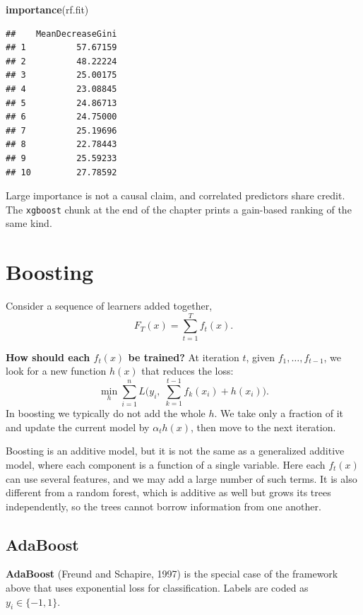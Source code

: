 \documentclass[
]{book}
\newenvironment{Shaded}{\begin{snugshade}}{\end{snugshade}}
\newcommand{\FunctionTok}[1]{\textcolor[rgb]{0.13,0.29,0.53}{\textbf{#1}}}
\newcommand{\NormalTok}[1]{#1}
\begin{document}
\begin{Shaded}
\begin{Highlighting}[]
\FunctionTok{importance}\NormalTok{(rf.fit)}
\end{Highlighting}
\end{Shaded}

\begin{verbatim}
##    MeanDecreaseGini
## 1          57.67159
## 2          48.22224
## 3          25.00175
## 4          23.08845
## 5          24.86713
## 6          24.75000
## 7          25.19696
## 8          22.78443
## 9          25.59233
## 10         27.78592
\end{verbatim}

Large importance is not a causal claim, and correlated predictors share credit. The \texttt{xgboost} chunk at the end of the chapter prints a gain-based ranking of the same kind.

\section{Boosting}\label{boosting}

Consider a sequence of learners added together,
\[
F_T(x) = \sum_{t=1}^{T} f_t(x).
\]

\textbf{How should each \(f_t(x)\) be trained?} At iteration \(t\), given \(f_1, \ldots, f_{t-1}\), we look for a new function \(h(x)\) that reduces the loss:
\[
\min_h \sum_{i=1}^{n} L\Biggl(y_i,\; \sum_{k=1}^{t-1} f_k(x_i) + h(x_i)\Biggr).
\]
In boosting we typically do not add the whole \(h\). We take only a fraction of it and update the current model by \(\alpha_t h(x)\), then move to the next iteration.

Boosting is an additive model, but it is not the same as a generalized additive model, where each component is a function of a single variable. Here each \(f_t(x)\) can use several features, and we may add a large number of such terms. It is also different from a random forest, which is additive as well but grows its trees independently, so the trees cannot borrow information from one another.

\vspace{1.2em}

\subsection{AdaBoost}\label{adaboost}

\textbf{AdaBoost} (Freund and Schapire, 1997) is the special case of the framework above that uses exponential loss for classification. Labels are coded as \(y_i \in \{-1, 1\}\).
\end{document}
